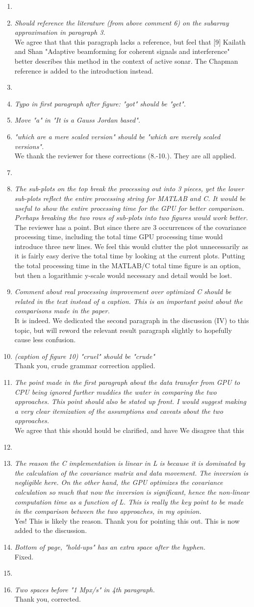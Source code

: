 \documentclass[11pt]{article} %
\newcommand\1{\vec 1}
\newcommand\q[1]{\textit{#1}}
\newcommand\qi[1]{\item\q{#1}}
\newcommand\hi[1]{\item[\textbf{#1}]}
\newcommand\ans[1]{#1}
\newcommand\ai[1]{\\[.5\baselineskip]\ans{#1}}
\begin{document}
\begin{enumerate}
%
\hi{Section II}
\qi{Should reference the literature (from above comment 6) on the subarray approximation in paragraph 3.}
\ai{We agree that that this paragraph lacks a reference, but feel that [9] Kailath and Shan "Adaptive beamforming for coherent signals and interference" better describes this method in the context of active sonar. The Chapman reference is added to the introduction instead.}
%
\hi{Section III (A-C)}
\qi{Typo in first paragraph after figure: "got" should be "get".}
\qi{Move "a" in "It is a Gauss Jordan based".}
\qi{"which are a mere scaled version" should be "which are merely scaled versions".}
\ai{We thank the reviewer for these corrections (8.-10.). They are all applied.}
%
\hi{Section IV}
\qi{The sub-plots on the top break the processing out into 3 pieces, yet the lower sub-plots reflect the entire processing string for MATLAB and C. It would be useful to show the entire processing time for the GPU for better comparison. Perhaps breaking the two rows of sub-plots into two figures would work better.}
\ai{The reviewer has a point. But since there are 3 occurrences of the covariance processing time, including the total time GPU processing time would introduce three new lines. We feel this would clutter the plot unnecessarily as it is fairly easy derive the total time by looking at the current plots. Putting the total processing time in the MATLAB/C total time figure is an option, but then a logarithmic y-scale would necessary and detail would be lost.}
%
\qi{Comment about real processing improvement over optimized C should be related in the text instead of a caption. This is an important point about the comparisons made in the paper.}
\ai{It is indeed. We dedicated the second paragraph in the discussion (IV) to this topic, but will reword the relevant result paragraph slightly to hopefully cause less confusion.}
%
\qi{(caption of figure 10) "cruel" should be "crude"}
\ai{Thank you, crude grammar correction applied.}
%
\qi{The point made in the first paragraph about the data transfer from GPU to CPU being ignored further muddies the water in comparing the two approaches. This point should also be stated up front. I would suggest making a very clear itemization of the assumptions and caveats about the two approaches.}
\ai{We agree that this should hould be clarified, and have We disagree that this }
%
\hi{Section V}
\qi{The reason the C implementation is linear in L is because it is dominated by the calculation of the covariance matrix and data movement. The inversion is negligible here. On the other hand, the GPU optimizes the covariance calculation so much that now the inversion is significant, hence the non-linear computation time as a function of L. This is really the key point to be made in the comparison between the two approaches, in my opinion.}
\ai{Yes! This is likely the reason. Thank you for pointing this out. This is now added to the discussion.}
\qi{Bottom of page, "hold-ups" has an extra space after the hyphen.}
\ai{Fixed.}
\hi{Section V}
\qi{Two spaces before "1 Mpx/s" in 4th paragraph. }
\ai{Thank you, corrected.}
\end{enumerate}
\end{document}
